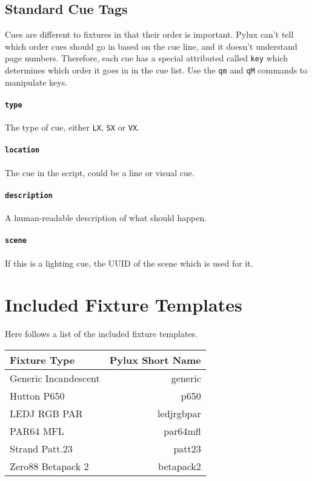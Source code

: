 \documentclass[a4paper]{article}
\begin{document}
\subsection{Standard Cue Tags}
Cues are different to fixtures in that their order is important. Pylux can't 
tell which order cues should go in based on the cue line, and it doesn't 
understand page numbers. Therefore, each cue has a special attributed called 
\texttt{key} which determines which order it goes in in the cue list. Use the 
\texttt{qm} and \texttt{qM} commands to manipulate keys.

\paragraph{\texttt{type}}
The type of cue, either \texttt{LX}, \texttt{SX} or \texttt{VX}.

\paragraph{\texttt{location}}
The cue in the script, could be a line or visual cue.

\paragraph{\texttt{description}}
A human-readable description of what should happen.

\paragraph{\texttt{scene}}
If this is a lighting cue, the UUID of the scene which is used for it.

\appendix
\section{Included Fixture Templates}
Here follows a list of the included fixture templates.
\begin{longtable}{|l|r|}
\hline
Fixture Type & Pylux Short Name \\ \hline
Generic Incandescent & generic \\
Hutton P650 & p650 \\
LEDJ RGB PAR & ledjrgbpar \\
PAR64 MFL & par64mfl \\
Strand Patt.23 & patt23 \\
Zero88 Betapack 2 & betapack2 \\
\hline
\end{longtable}
\end{document}
